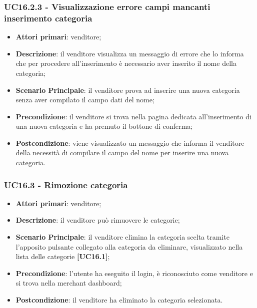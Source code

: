\subsubsection{UC16.2.3 - Visualizzazione errore campi mancanti inserimento categoria}
\begin{itemize}
\item \textbf{Attori primari}: venditore;
\item \textbf{Descrizione}: il venditore visualizza un messaggio di errore che lo informa che per procedere all'inserimento è necessario aver inserito il nome della categoria;
\item \textbf{Scenario Principale}: il venditore prova ad inserire una nuova categoria senza aver compilato il campo dati del nome;
\item \textbf{Precondizione}: il venditore si trova nella pagina dedicata all'inserimento di una nuova categoria e ha premuto il bottone di conferma;
\item \textbf{Postcondizione}: viene visualizzato un messaggio che informa il venditore della necessità di compilare il campo del nome per inserire una nuova categoria.
\end{itemize}

\subsubsection{UC16.3 - Rimozione categoria}
\begin{itemize}
\item \textbf{Attori primari}: venditore;
\item \textbf{Descrizione}: il venditore può rimuovere le categorie;
\item \textbf{Scenario Principale}: il venditore elimina la categoria scelta tramite l'apposito pulsante collegato alla categoria da eliminare, visualizzato nella lista delle categorie \textbf{[UC16.1]};
\item \textbf{Precondizione}: l'utente ha eseguito il login, è riconosciuto come venditore e si trova nella merchant dashboard;
\item \textbf{Postcondizione}: il venditore ha eliminato la categoria selezionata.
\end{itemize}



